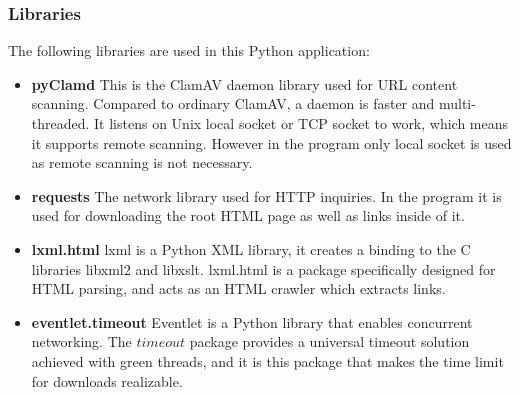 \subsubsection{Libraries}
The following libraries are used in this Python application:
\begin{itemize}
\item {\bf pyClamd} This is the ClamAV daemon library used for URL content 
scanning. Compared to ordinary ClamAV, a daemon is faster and 
multi-threaded. It listens on Unix local socket or TCP socket to work, which 
means it supports remote scanning. However in the program only local socket is 
used as remote scanning is not necessary. 

\item {\bf requests} The network library used for HTTP inquiries. In the 
program it is used for downloading the root HTML page as well as links inside 
of it. 

\item {\bf lxml.html} lxml is a Python XML library, it creates a 
binding to the C libraries libxml2 and libxslt.\cite{lxml} lxml.html is a 
package specifically designed for HTML parsing, and acts as an HTML crawler 
which extracts links. 

\item {\bf eventlet.timeout} Eventlet is a Python library that enables 
concurrent networking. The $timeout$ package provides a universal timeout 
solution achieved with green threads, and it is this package that makes the time limit 
for downloads realizable. 
\end{itemize}


